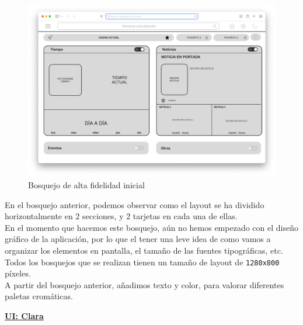 \documentclass[../ei103948-project-documentation.tex]{subfiles}
\begin{document}
                                \begin{figure}[H]
                                    \begin{center}
                                        \hspace*{-7mm}
                                    \includegraphics[scale=0.87]{images/Boceto1.png}
                                    \end{center}
                                    \caption{Bosquejo de alta fidelidad inicial}
                                \end{figure}

                                En el bosquejo anterior, podemos observar como el layout se ha dividido horizontalmente en 2 secciones, y 2 tarjetas en cada una de ellas.\\
                                
                                En el momento que hacemos este bosquejo, aún no hemos empezado con el diseño gráfico de la aplicación, por lo que el tener una leve idea de como vamos a organizar los elementos en pantalla, el tamaño de las fuentes tipográficas, etc. Todos los bosquejos que se realizan tienen un tamaño de layout de \texttt{1280x800} píxeles.\\

                                A partir del bosquejo anterior, añadimos texto y color, para valorar diferentes paletas cromáticas.\\

                                \begin{center}
                                    \underline{\textbf{UI: Clara}}
                                \end{center}
\end{document}
